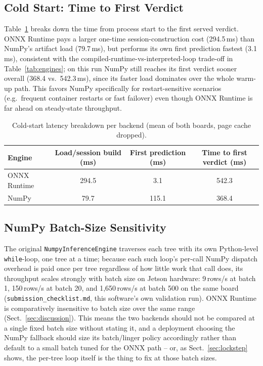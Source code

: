 \documentclass[runningheads]{llncs}
\begin{document}
\subsection{Cold Start: Time to First Verdict}

Table~\ref{tab:coldstart} breaks down the time from process start to the first served verdict. ONNX Runtime pays a larger one-time session-construction cost (294.5\,ms) than NumPy's artifact load (79.7\,ms), but performs its own first prediction fastest (3.1\,ms), consistent with the compiled-runtime-vs-interpreted-loop trade-off in Table~\ref{tab:engines}; on this run NumPy still reaches its first verdict sooner overall (368.4 vs.\ 542.3\,ms), since its faster load dominates over the whole warm-up path. This favors NumPy specifically for restart-sensitive scenarios (e.g.\ frequent container restarts or fast failover) even though ONNX Runtime is far ahead on steady-state throughput.

\begin{table}[htbp]
  \caption{Cold-start latency breakdown per backend (mean of both boards, page cache dropped).}
  \label{tab:coldstart}
  \centering
  \small
  \begin{tabular}{l c c c}
    \toprule
    Engine & Load/session build (ms) & First prediction (ms) & Time to first verdict (ms) \\
    \midrule
    ONNX Runtime & 294.5 & 3.1 & 542.3 \\
    NumPy        & 79.7  & 115.1 & 368.4 \\
    \bottomrule
  \end{tabular}
\end{table}

\subsection{NumPy Batch-Size Sensitivity}
\label{sec:batch-sensitivity}

The original \texttt{NumpyInferenceEngine} traverses each tree with its own Python-level \texttt{while}-loop, one tree at a time; because each such loop's per-call NumPy dispatch overhead is paid once per tree regardless of how little work that call does, its throughput scales strongly with batch size on Jetson hardware: 9\,rows/s at batch 1, 150\,rows/s at batch 20, and 1{,}650\,rows/s at batch 500 on the same board (\texttt{submission\_checklist.md}, this software's own validation run). ONNX Runtime is comparatively insensitive to batch size over the same range (Sect.~\ref{sec:discussion}). This means the two backends should not be compared at a single fixed batch size without stating it, and a deployment choosing the NumPy fallback should size its batch/linger policy accordingly rather than default to a small batch tuned for the ONNX path -- or, as Sect.~\ref{sec:lockstep} shows, the per-tree loop itself is the thing to fix at those batch sizes.
\end{document}
